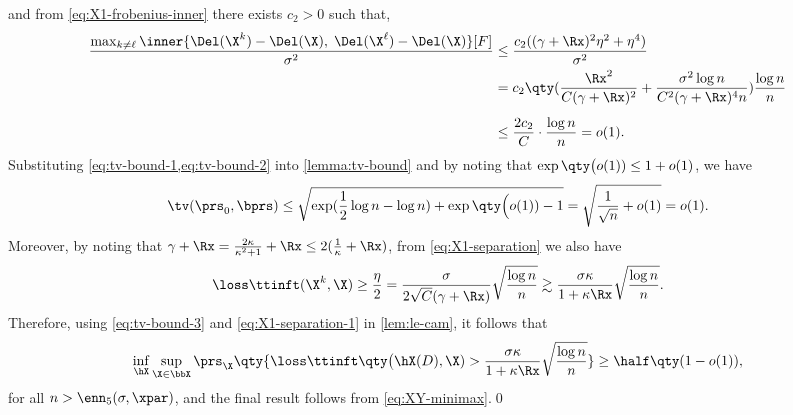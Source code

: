 \documentclass[10pt]{article}
\begin{document}
and from \ref{eq:X1-frobenius-inner} there exists $c_2 > 0$ such that,
\begin{align}
    \frac{\max_{k \neq \ell}\inner{\Del(\X^k) - \Del(\X),\; \Del(\X^\ell) - \Del(\X)}[F]}{\sigma^2} 
    &\le \frac{c_2((\gamma+\Rx)^2\eta^2 + \eta^4)}{\sigma^2}\\ 
    &= {c_2}\qty(\frac{\Rx^2}{C(\gamma+\Rx)^2} + \frac{\sigma^2\log{n}}{C^2(\gamma+\Rx)^4n})\frac{\log{n}}{n}\\[5pt]
    &\le \frac{2c_2}{C} \cdot \frac{\log{n}}{n} = o(1).\label{eq:tv-bound-2}
\end{align}
Substituting \cref{eq:tv-bound-1,eq:tv-bound-2} into \cref{lemma:tv-bound} and by noting that $\exp\qty\big(o(1)) \le 1 + o(1)$, we have
\begin{align}
    \tv(\prs_0, \bprs) \le \sqrt{ \exp( \frac{1}{2}\log{n} - \log{n} ) + \exp\qty\Big(o(1)) - 1 } = \sqrt{ \frac{1}{\sqrt{n}} + o(1) } = o(1).\label{eq:tv-bound-3}
\end{align}
Moreover, by noting that ${\gamma + \Rx} =  \frac{2\kappa}{\kappa^2+1} + \Rx \le 2(\frac{1}{\kappa} + \Rx)$, from \ref{eq:X1-separation} we also have
\begin{align}
    \loss\ttinft(\X^k, \X) \ge \frac{\eta}{2} = \frac{\sigma}{2\sqrt{C}(\gamma+\Rx)}\sqrt{\frac{\log{n}}{n}} \gtrsim \frac{\sigma\kappa}{1 + \kappa\Rx}\sqrt{\frac{\log{n}}{n}}.\label{eq:X1-separation-1}
\end{align}
Therefore, using \cref{eq:tv-bound-3} and \cref{eq:X1-separation-1} in \cref{lem:le-cam}, it follows that
\begin{align}
    \inf_{\hX}\sup_{\X \in \bbX} \prs_{\X}\qty{ \loss\ttinft\qty\big(\hX(D), \X) > \frac{\sigma\kappa}{1 + \kappa\Rx}\sqrt{\frac{\log{n}}{n}} } \ge \half\qty(1 - o(1)),
\end{align}
for all $n > \enn_5(\sigma, \xpar)$, and the final result follows from \cref{eq:XY-minimax}.\qed





















\clearpage
\appendix
\end{document}
